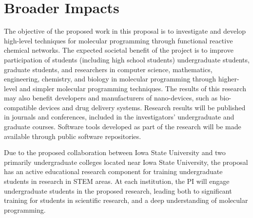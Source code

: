 \section{Broader Impacts}

The objective of the proposed work in this proposal is to investigate and develop high-level techniques for molecular programming through functional reactive chemical networks.
The expected societal benefit of the project is to improve participation of students (including high school students) undergraduate students, graduate students, and researchers in computer science, mathematics, engineering, chemistry, and biology in molecular programming through higher-level and simpler molecular programming techniques.
The results of this research may also benefit developers and manufacturers of nano-devices, such as bio-compatible devices and drug delivery systems.
Research results will be published in journals and conferences, included in the investigators' undergraduate and graduate courses.
Software tools developed as part of the research will be made available through public software repositories.

Due to the proposed collaboration between Iowa State University and two primarily undergraduate colleges located near Iowa State University, the proposal has an active educational research component for training undergraduate students in research in STEM areas. 
At each institution, the PI will engage undergraduate students in the proposed research, leading both to significant training for students in scientific research, and a deep understanding of molecular programming.
 









